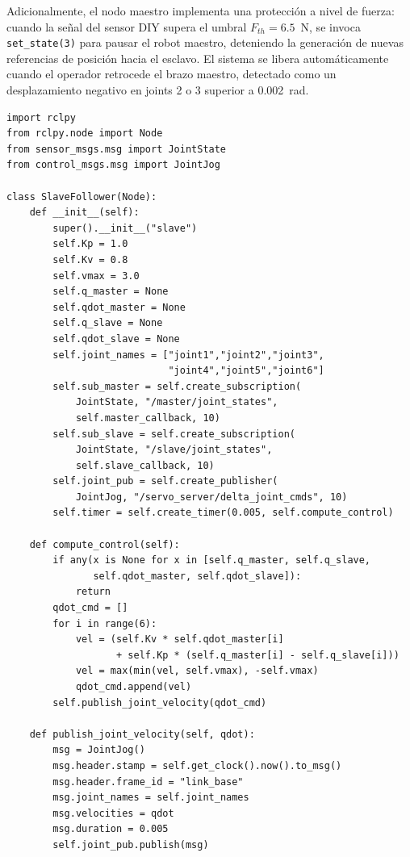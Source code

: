 \documentclass[journal,10pt,twoside]{IEEEtran}
\begin{document}
\begin{itemize}
Adicionalmente, el nodo maestro implementa una protección a nivel 
de fuerza: cuando la señal del sensor DIY supera el umbral 
$F_{th} = 6.5$~N, se invoca \texttt{set\_state(3)} para pausar 
el robot maestro, deteniendo la generación de nuevas referencias 
de posición hacia el esclavo. El sistema se libera automáticamente 
cuando el operador retrocede el brazo maestro, detectado como un 
desplazamiento negativo en joints 2 o 3 superior a 0.002~rad.
\end{itemize}
\begin{lstlisting}[caption={Ciclo de control del robot Esclavo},
                   label={lst:slave}]
import rclpy
from rclpy.node import Node
from sensor_msgs.msg import JointState
from control_msgs.msg import JointJog

class SlaveFollower(Node):
    def __init__(self):
        super().__init__("slave")
        self.Kp = 1.0
        self.Kv = 0.8
        self.vmax = 3.0
        self.q_master = None
        self.qdot_master = None
        self.q_slave = None
        self.qdot_slave = None
        self.joint_names = ["joint1","joint2","joint3",
                            "joint4","joint5","joint6"]
        self.sub_master = self.create_subscription(
            JointState, "/master/joint_states",
            self.master_callback, 10)
        self.sub_slave = self.create_subscription(
            JointState, "/slave/joint_states",
            self.slave_callback, 10)
        self.joint_pub = self.create_publisher(
            JointJog, "/servo_server/delta_joint_cmds", 10)
        self.timer = self.create_timer(0.005, self.compute_control)

    def compute_control(self):
        if any(x is None for x in [self.q_master, self.q_slave,
               self.qdot_master, self.qdot_slave]):
            return
        qdot_cmd = []
        for i in range(6):
            vel = (self.Kv * self.qdot_master[i]
                   + self.Kp * (self.q_master[i] - self.q_slave[i]))
            vel = max(min(vel, self.vmax), -self.vmax)
            qdot_cmd.append(vel)
        self.publish_joint_velocity(qdot_cmd)

    def publish_joint_velocity(self, qdot):
        msg = JointJog()
        msg.header.stamp = self.get_clock().now().to_msg()
        msg.header.frame_id = "link_base"
        msg.joint_names = self.joint_names
        msg.velocities = qdot
        msg.duration = 0.005
        self.joint_pub.publish(msg)
\end{lstlisting}
\end{document}
